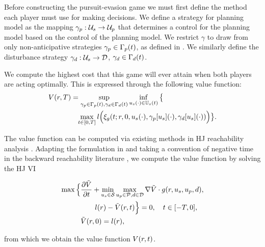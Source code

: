 Before constructing the pursuit-evasion game we must first define the method each player must use for making decisions. 
We define a strategy for planning model as the mapping $\gamma_{p} : \mathcal{U}_s \rightarrow \mathcal{U}_p$ that determines a control for the planning model based on the control of the planning model. We restrict $\gamma$ to draw from only non-anticipative strategies $\gamma_{p} \in \Gamma_p(t)$, as defined in \cite{Mitchell05}. 
We similarly define the disturbance strategy $\gamma_{d}: \mathcal{U}_s \rightarrow \mathcal{D}$, $\gamma_{d} \in \Gamma_d(t)$.

We compute the highest cost that this game will ever attain when both players are acting optimally. 
This is expressed through the following value function:
\begin{align}
&V(\rstate,\thor)= \sup_{\gamma_{\pstate} \in \Gamma_\pstate(t), \gamma_{\dstb} \in \Gamma_\dstb(t)} \inf_{\tctrl(\cdot) \in \tcfset(t)} \big\{ \nonumber \\
&\qquad\qquad \max_{\tvar\in [0, \thor]} \errfunc\Big(\rtraj(\tvar; \rstate, 0, \tctrl(\cdot), \gamma_\pstate[\tctrl](\cdot), \gamma_\dstb[\tctrl](\cdot))\Big)\big\}. \label{eq:valfunc}
\end{align} 

The value function can be computed via existing methods in HJ reachability analysis \cite{Mitchell05, Fisac15}.
Adapting the formulation in \cite{Fisac15} and taking a convention of negative time in the backward reachability literature \cite{Chen2016DecouplingJournal, Chen2018}, we compute the value function by solving the HJ VI

\begin{align}
\max \Big\{&\frac{\partial \tilde\valfunc}{\partial \tvar} + \min_{\tctrl\in\tset} \max_{\pctrl\in\pset, \dstb\in\dset} \nabla \tilde\valfunc \cdot \rdyn(\rstate, \tctrl, \pctrl, \dstb), \nonumber \\
&\qquad\errfunc(\rstate) - \tilde\valfunc(\rstate, \tvar)\Big\} = 0, \quad \tvar \in [-T, 0], \label{eq:HJVI} \\
&\tilde\valfunc(\rstate, 0) = \errfunc(\rstate), \nonumber
\end{align}

\noindent from which we obtain the value function $V(r, t)$.


